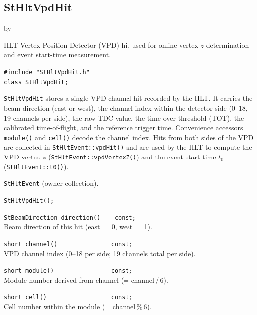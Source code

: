 \documentclass[twoside]{article}
\newcommand{\entrylabel}[1]{\mbox{\textbf{{#1}}}\hfil}%
\newenvironment{entry}
{\begin{list}{}%
    {\renewcommand{\makelabel}{\entrylabel}%
     \setlength{\labelwidth}{90pt}%
     \setlength{\leftmargin}{\labelwidth}
     \advance\leftmargin by \labelsep%
      }%
    }%
  {\end{list}}
\newcommand{\Entrylabel}[1]%
{\raisebox{0pt}[1ex][0pt]{\makebox[\labelwidth][l]%
    {\parbox[t]{\labelwidth}{\hspace{0pt}\textbf{{#1}}}}}}
\newenvironment{Entry}%
{\renewcommand{\entrylabel}{\Entrylabel}\begin{entry}}%
  {\end{entry}}
\begin{document}
\subsection{StHltVpdHit}
\label{sec:StHltVpdHit}
\begin{Entry}
\item[Summary] HLT Vertex Position Detector (VPD) hit used for online
    vertex-$z$ determination and event start-time measurement.
\item[Synopsis]
    \verb+#include "StHltVpdHit.h"+\\
    \verb+class StHltVpdHit;+\\
\item[Description]
    \texttt{StHltVpdHit} stores a single VPD channel hit recorded by
    the HLT.  It carries the beam direction (east or west), the channel
    index within the detector side (0--18, 19 channels per side), the
    raw TDC value, the time-over-threshold (TOT), the calibrated
    time-of-flight, and the reference trigger time.  Convenience
    accessors \texttt{module()} and \texttt{cell()} decode the channel
    index.  Hits from both sides of the VPD are collected in
    \texttt{StHltEvent::vpdHit()} and are used by the HLT to compute
    the VPD vertex-$z$ (\texttt{StHltEvent::vpdVertexZ()}) and the
    event start time $t_0$ (\texttt{StHltEvent::t0()}).
\item[Related Classes]
    \texttt{StHltEvent} (owner collection).
\item[Public\\ Constructors]
    \verb+StHltVpdHit();+\\
\item[Public Member\\ Functions]
    \verb+StBeamDirection direction()    const;+\\
    Beam direction of this hit (east\,$=$\,0, west\,$=$\,1).

    \verb+short channel()               const;+\\
    VPD channel index (0--18 per side; 19 channels total per side).

    \verb+short module()                const;+\\
    Module number derived from channel (= channel\,$/$\,6).

    \verb+short cell()                  const;+\\
    Cell number within the module (= channel\,$\%$\,6).


\end{Entry}
\end{document}
